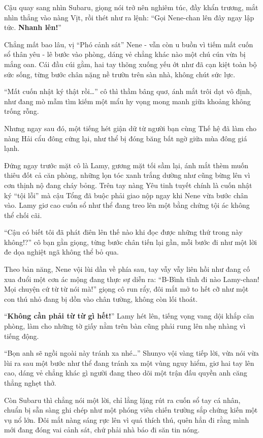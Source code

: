 \documentclass[../main.tex]{subfiles}
\begin{document}
Cậu quay sang nhìn Subaru, giọng nói trở nên nghiêm túc, đầy khẩn trương, mắt nhìn thẳng vào nàng Vịt, rồi thét như ra lệnh: ``Gọi Nene-chan lên đây ngay lập tức. \textbf{Nhanh lên!}''

\ct

Chẳng mất bao lâu, vị ``Phó cảnh sát'' Nene - vẫn còn u buồn vì tiếm mất cuốn sổ thân yêu - lê bước vào phòng, dáng vẻ chẳng khác nào một chú cún vừa bị mắng oan. Cái đầu cúi gằm, hai tay thõng xuống yếu ớt như đã cạn kiệt toàn bộ sức sống, từng bước chân nặng nề trườn trên sàn nhà, không chút sức lực.

``Mất cuốn nhật ký thật rồi\dots'' cô thì thầm bâng quơ, ánh mắt trôi dạt vô định, như đang mò mẫm tìm kiếm một mẩu hy vọng mong manh giữa khoảng không trống rỗng.

Nhưng ngay sau đó, một tiếng hét giận dữ từ người bạn cùng Thế hệ đã làm cho nàng Hải cẩu đông cứng lại, như thể bị đóng băng bất ngờ giữa mùa đông giá lạnh.

Đứng ngay trước mặt cô là Lamy, gương mặt tối sầm lại, ánh mắt thèm muốn thiêu đốt cả căn phòng, những lọn tóc xanh trắng dường như cũng bừng lên vì cơn thịnh nộ đang cháy bỏng. Trên tay nàng Yêu tinh tuyết chính là cuốn nhật ký ``tội lỗi'' mà cậu Tổng đã buộc phải giao nộp ngay khi Nene vừa bước chân vào. Lamy giơ cao cuốn sổ như thể đang treo lên một bằng chứng tội ác không thể chối cãi.

``Cậu có biết tôi đã phát điên lên thế nào khi đọc được những thứ trong này không!?'' cô bạn gằn giọng, từng bước chân tiến lại gần, mỗi bước đi như một lời đe dọa nghiệt ngã không thể bỏ qua.

Theo bản năng, Nene vội lùi dần về phía sau, tay vẫy vẫy liên hồi như đang cố xua đuổi một cơn ác mộng đang thực sự diễn ra: ``B-Bình tĩnh đi nào Lamy-chan! Mọi chuyện cứ từ từ nói mà!'' giọng cô run rẩy, đôi mắt mở to hết cỡ như một con thú nhỏ đang bị dồn vào chân tường, không còn lối thoát.

``\textbf{Không cần phải từ từ gì hết!}'' Lamy hét lên, tiếng vọng vang dội khắp căn phòng, làm cho những tờ giấy nằm trên bàn cũng phải rung lên nhẹ nhàng vì tiếng động.

``Bọn anh sẽ ngồi ngoài này tránh xa nhé\dots'' Shunyo vội vàng tiếp lời, vừa nói vừa lùi ra sau một bước như thể đang tránh xa một vùng nguy hiểm, giơ hai tay lên cao, dáng vẻ chẳng khác gì người đang theo dõi một trận đấu quyền anh căng thẳng nghẹt thở.

Còn Subaru thì chẳng nói một lời, chỉ lẳng lặng rút ra cuốn sổ tay cá nhân, chuẩn bị sẵn sàng ghi chép như một phóng viên chiến trường sắp chứng kiến một vụ nổ lớn. Đôi mắt nàng sáng rực lên vì quá thích thú, quên hẳn đi rằng mình mới đang đóng vai cảnh sát, chứ phải nhà báo đi săn tin nóng.
\end{document}

